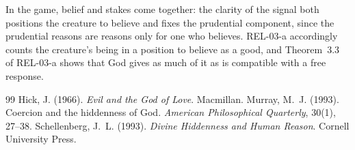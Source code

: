 \documentclass{situationist-preprint}
\begin{document}
\begin{reply}
In the game, belief and stakes come together: the clarity of the signal both positions the creature to believe and fixes the prudential component, since the prudential reasons are reasons only for one who believes. REL-03-a accordingly counts the creature's being in a position to believe as a good, and Theorem~3.3 of REL-03-a shows that God gives as much of it as is compatible with a free response.
\end{reply}

\begin{thebibliography}{99}\small
{} Hick, J. (1966). \emph{Evil and the God of Love}. Macmillan.
 Murray, M.~J. (1993). Coercion and the hiddenness of God. \emph{American Philosophical Quarterly}, 30(1), 27--38.
 Schellenberg, J.~L. (1993). \emph{Divine Hiddenness and Human Reason}. Cornell University Press.
\end{thebibliography}
\end{document}

